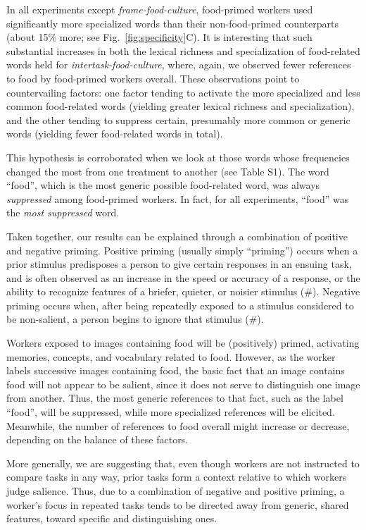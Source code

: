 \documentclass[12pt]{article}
\begin{document}
In all experiments except \textit{frame-food-culture}, food-primed workers 
used significantly more specialized words than their non-food-primed 
counterparts (about 15\% more; see Fig.~\ref{fig:specificity}C).
It is interesting that such substantial increases in both the lexical 
richness and specialization of food-related words 
held for \textit{intertask-food-culture}, where, again, we observed fewer 
references to food by food-primed workers overall. These observations point 
to countervailing factors: one factor tending to activate the more 
specialized and less common food-related words 
(yielding greater lexical richness and specialization), and the other tending 
to suppress certain, presumably more common or generic words 
(yielding fewer food-related words in total).

This hypothesis is corroborated when we look at those words whose 
frequencies changed the most from one treatment to another (see Table S1).  
The word ``food'', which is the most generic possible food-related word, was 
always \textit{suppressed} among food-primed workers.  In fact, 
for all experiments, ``food'' was the \textit{most suppressed} word.

Taken together, our results can be 
explained through a combination of positive and negative priming.
Positive priming (usually simply ``priming'') occurs when a prior stimulus 
predisposes a person to give certain responses in an ensuing task, and
is often observed as an increase in the speed or accuracy of a response, or
the ability to recognize features of a briefer, quieter, or noisier stimulus 
(\#).
Negative priming occurs when, after being repeatedly exposed to a stimulus 
considered to be non-salient, a person begins to ignore that 
stimulus (\#).  

Workers exposed to images containing food will be (positively) primed, 
activating memories, concepts, and vocabulary related to food.  
However, as the worker labels successive images containing food, the basic 
fact that an image contains food will not appear to be salient, since it 
does not serve to distinguish one image from another.  Thus, the most 
generic references to that fact, such as the label ``food'', 
will be suppressed, while more specialized references will be elicited.  
Meanwhile, the number of references to food overall might increase or 
decrease, depending on the balance of these factors.  

More generally, we are suggesting that, even though workers are not 
instructed to compare tasks in any way, prior tasks form a 
context relative to which workers judge salience.  Thus, due to a combination 
of negative and positive priming, a worker's focus 
in repeated tasks tends to be directed away from generic, shared features, 
toward specific and distinguishing ones.
\end{document}
